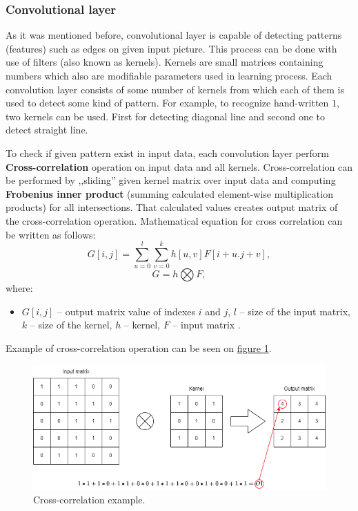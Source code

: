     \subsubsection*{Convolutional layer}\label{sec:convolutional-layer}
    As it was mentioned before, convolutional layer is capable of detecting patterns (features) such as edges on given input picture. This process can be done with use of filters (also known as kernels). Kernels are small matrices containing numbers which also are modifiable parameters used in learning process. Each  convolution layer consists of some number of kernels from which each of them is used to detect some kind of pattern. For example, to recognize hand-written $1$, two kernels can be used. First for detecting diagonal line and second one to detect straight line.

    To check if given pattern exist in input data, each convolution layer perform \textbf{Cross-correlation} operation on input data and all kernels. Cross-correlation can be performed by ,,sliding'' given kernel matrix over input data and computing \textbf{Frobenius inner product} (summing calculated element-wise multiplication products) \cite{bib:book-frobenius-inner-product} for all intersections. That calculated values creates output matrix of the cross-correlation operation. Mathematical equation for cross correlation can be written as follows:
    \begin{equation}
        G[i, j] = \sum_{u = 0}^{l} \sum_{v = 0}^{k} h[u, v] F[i+u. j+v],
    \end{equation}
    \begin{equation}
        G = h \bigotimes F,
    \end{equation}
    where:
    \begin{itemize}[label=]
        \item $G[i, j]$ -- output matrix value of indexes $i$ and $j$, $l$ -- size of the input matrix, $k$ -- size of the kernel, $h$ -- kernel, $F$ -- input matrix \cite{bib:article-cross-correlation}.
    \end{itemize}
    Example of cross-correlation operation can be seen on \hyperref[fig:cross-correlation-example]{figure \ref*{fig:cross-correlation-example}}.
    \begin{figure}
        \centering
        \includegraphics[width=\textwidth]{dependencies/pictures/Cross-correlation_example.png}
        \caption{Cross-correlation example.}
        \label{fig:cross-correlation-example}
    \end{figure}
